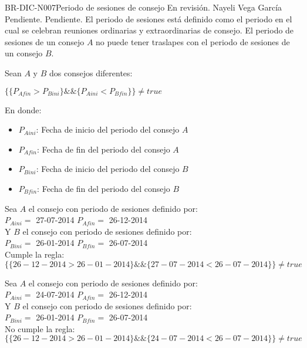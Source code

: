 \begin{BusinessRule}{BR-DIC-N007}{Periodo de sesiones de consejo}
	{\bcAutorization}  %
	{\btEnabler}    %
	{\blControlling}    %
	\BRItem[Estado] En revisión.
	 Nayeli Vega García
	 Pendiente.
	 Pendiente.
	\BRItem[Descripción]  El periodo de sesiones está definido como el periodo en el cual se celebran reuniones ordinarias y extraordinarias de consejo. El periodo de sesiones de un consejo $A$ no puede tener traslapes con el periodo de sesiones de un consejo $B$.  
	
	\BRItem[Sentencia] Sean $A$ y $B$ dos consejos diferentes:
	\begin{center}
		$ \{ \{P_{Afin} > P_{Bini} \} \&\& \{P_{Aini} < P_{Bfin}\} 
		\} \neq true$ 
	\end{center}
	
	En donde:
	\begin{itemize}
		\item $P_{Aini}$: Fecha de inicio del periodo del consejo $A$
		\item $P_{Afin}$: Fecha de fin del periodo del consejo $A$
		\item $P_{Bini}$: Fecha de inicio del periodo del consejo $B$
		\item $P_{Bfin}$: Fecha de fin del periodo del consejo $B$
		
	\end{itemize} 

	Sea $A$ el consejo con periodo de sesiones definido por:\\
	$P_{Aini}=$ 27-07-2014
	$P_{Afin}=$ 26-12-2014 \\
	Y $B$ el consejo con periodo de sesiones definido por: \\
	$P_{Bini}=$ 26-01-2014
	$P_{Bfin}=$ 26-07-2014 \\
	
	Cumple la regla:
	$ \{ \{26-12-2014 > 26-01-2014 \} \&\& \{27-07-2014 < 26-07-2014\} 
	\} \neq true$ 


	Sea $A$ el consejo con periodo de sesiones definido por:\\
	$P_{Aini}=$ 24-07-2014
	$P_{Afin}=$ 26-12-2014 \\
	Y $B$ el consejo con periodo de sesiones definido por: \\
	$P_{Bini}=$ 26-01-2014
	$P_{Bfin}=$ 26-07-2014 \\
	
	No cumple la regla:
	$ \{ \{26-12-2014 > 26-01-2014 \} \&\& \{24-07-2014 < 26-07-2014\} 
	\} \neq true$
	
\end{BusinessRule}

